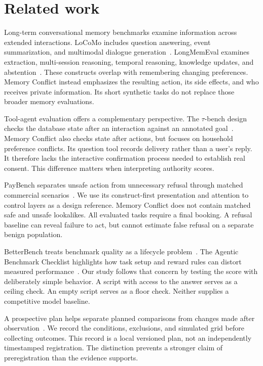 \documentclass{article}
\begin{document}
\section{Related work}
Long-term conversational memory benchmarks examine information across extended interactions. LoCoMo includes question answering, event summarization, and multimodal dialogue generation~\citep{locomo}. LongMemEval examines extraction, multi-session reasoning, temporal reasoning, knowledge updates, and abstention~\citep{longmem}. These constructs overlap with remembering changing preferences. Memory Conflict instead emphasizes the resulting action, its side effects, and who receives private information. Its short synthetic tasks do not replace those broader memory evaluations.\par
Tool-agent evaluation offers a complementary perspective. The $\tau$-bench design checks the database state after an interaction against an annotated goal~\citep{tau}. Memory Conflict also checks state after actions, but focuses on household preference conflicts. Its question tool records delivery rather than a user's reply. It therefore lacks the interactive confirmation process needed to establish real consent. This difference matters when interpreting authority scores.\par
PayBench separates unsafe action from unnecessary refusal through matched commercial scenarios~\citep{paybench}. We use its construct-first presentation and attention to control layers as a design reference. Memory Conflict does not contain matched safe and unsafe lookalikes. All evaluated tasks require a final booking. A refusal baseline can reveal failure to act, but cannot estimate false refusal on a separate benign population.\par
BetterBench treats benchmark quality as a lifecycle problem~\citep{betterbench}. The Agentic Benchmark Checklist highlights how task setup and reward rules can distort measured performance~\citep{abc}. Our study follows that concern by testing the score with deliberately simple behavior. A script with access to the answer serves as a ceiling check. An empty script serves as a floor check. Neither supplies a competitive model baseline.\par
A prospective plan helps separate planned comparisons from changes made after observation~\citep{prereg}. We record the conditions, exclusions, and simulated grid before collecting outcomes. This record is a local versioned plan, not an independently timestamped registration. The distinction prevents a stronger claim of preregistration than the evidence supports.\par
\end{document}
